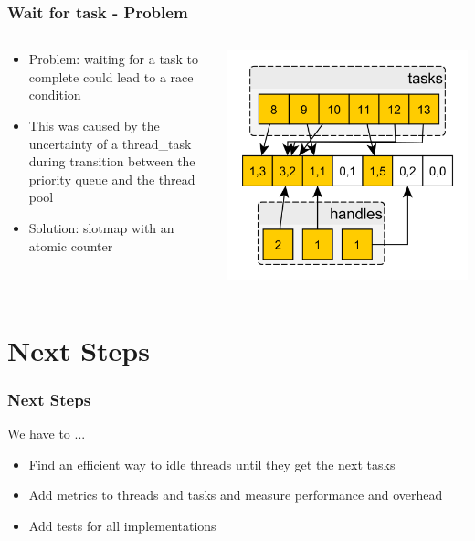 \documentclass{beamer}
\begin{document}
\begin{frame}
	\frametitle{Wait for task - Problem}
	\begin{columns}
		\begin{column}{0.48\textwidth}
			\begin{itemize}
				\item Problem: waiting for a task to complete could lead to a
				race condition
				\item This was caused by the uncertainty of a thread\_task
				during transition between the priority queue and the
				thread pool
				\item Solution: slotmap with an atomic counter
			\end{itemize}
		\end{column}
		\begin{column}{0.48\textwidth}
			\includegraphics[width=1.0\textwidth]{waitingconcept.png}
		\end{column}
	\end{columns}
\end{frame}

\section{Next Steps}
\begin{frame}
	\frametitle{Next Steps}
	We have to ...
	\begin{itemize}
		\item Find an efficient way to idle threads until they get the next tasks
		\item Add metrics to threads and tasks and measure performance and overhead
		\item Add tests for all implementations
	\end{itemize}
\end{frame}
\end{document}
